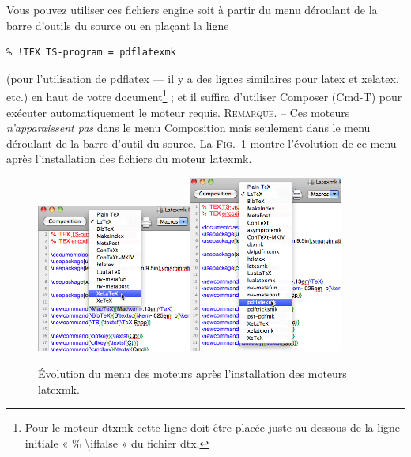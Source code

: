 \documentclass[11pt,french]{article}
\newcommand{\latexmk}{\textsf{latexmk}}
\newcommand{\cmdkey}{\textsf{Cmd}}
\newcommand{\mnu}[1]{\textsf{#1}}
\newcommand{\cmd}[1]{\textsf{#1}}
\begin{document}
Vous pouvez utiliser ces fichiers \cmd{engine} soit à partir du menu déroulant de la barre d'outils du source ou en plaçant la ligne
\begin{verbatim}
% !TEX TS-program = pdflatexmk
\end{verbatim}
(pour l'utilisation de \cmd{pdflatex} --- il y a des lignes similaires pour \cmd{latex} et \cmd{xelatex}, etc.) en haut de votre document\footnote{Pour le moteur \cmd{dtxmk} cette ligne doit être placée juste au-dessous de la ligne initiale « \cmd{\% \textbackslash iffalse} » du fichier \cmd{dtx}.} ; et il suffira d'utiliser \mnu{Composer} (\cmd{\cmdkey-T}) pour exécuter automatiquement le moteur requis. \textsc{Remarque}. -- Ces moteurs \emph{n'apparaissent pas} dans le menu \mnu{Composition} mais seulement dans le menu déroulant de la barre d'outil du source. La \textsc{Fig.}~\ref{figs:popupmenus} montre l'évolution de ce menu après l'installation des fichiers du moteur \latexmk.

\begin{figure}
\centering
\includegraphics[width=2in]{figs/avant}\qquad\includegraphics[width=2in]{figs/apres}
\caption{Évolution du menu des moteurs après l'installation des moteurs \latexmk.\label{figs:popupmenus}}
\end{figure}
\end{document}
